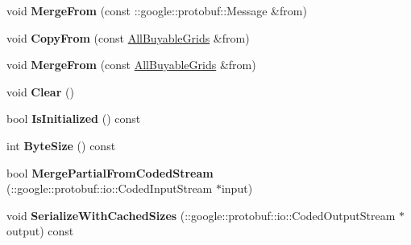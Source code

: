 \begin{DoxyCompactItemize}
\item 
\hypertarget{classmonopoly_1_1_all_buyable_grids_a18d90d89565400a55ee64d9d872d693e}{}void {\bfseries Merge\+From} (const \+::google\+::protobuf\+::\+Message \&from)\label{classmonopoly_1_1_all_buyable_grids_a18d90d89565400a55ee64d9d872d693e}

\item 
\hypertarget{classmonopoly_1_1_all_buyable_grids_a9f0e672d3a089e5165b0ec23db106200}{}void {\bfseries Copy\+From} (const \hyperlink{classmonopoly_1_1_all_buyable_grids}{All\+Buyable\+Grids} \&from)\label{classmonopoly_1_1_all_buyable_grids_a9f0e672d3a089e5165b0ec23db106200}

\item 
\hypertarget{classmonopoly_1_1_all_buyable_grids_a56f73a697b8834f68760d16df7d2552e}{}void {\bfseries Merge\+From} (const \hyperlink{classmonopoly_1_1_all_buyable_grids}{All\+Buyable\+Grids} \&from)\label{classmonopoly_1_1_all_buyable_grids_a56f73a697b8834f68760d16df7d2552e}

\item 
\hypertarget{classmonopoly_1_1_all_buyable_grids_acd7491cf2d04473ea03e21fc4ddc2e70}{}void {\bfseries Clear} ()\label{classmonopoly_1_1_all_buyable_grids_acd7491cf2d04473ea03e21fc4ddc2e70}

\item 
\hypertarget{classmonopoly_1_1_all_buyable_grids_a4ead6081cc726152784d14b63c37781b}{}bool {\bfseries Is\+Initialized} () const \label{classmonopoly_1_1_all_buyable_grids_a4ead6081cc726152784d14b63c37781b}

\item 
\hypertarget{classmonopoly_1_1_all_buyable_grids_a4cff9ff1770ce5f90173770a70eb9b06}{}int {\bfseries Byte\+Size} () const \label{classmonopoly_1_1_all_buyable_grids_a4cff9ff1770ce5f90173770a70eb9b06}

\item 
\hypertarget{classmonopoly_1_1_all_buyable_grids_af26b914074e22f09fa999cc3d6d90407}{}bool {\bfseries Merge\+Partial\+From\+Coded\+Stream} (\+::google\+::protobuf\+::io\+::\+Coded\+Input\+Stream $\ast$input)\label{classmonopoly_1_1_all_buyable_grids_af26b914074e22f09fa999cc3d6d90407}

\item 
\hypertarget{classmonopoly_1_1_all_buyable_grids_a00a34af40b1d43f3d13582d32113410f}{}void {\bfseries Serialize\+With\+Cached\+Sizes} (\+::google\+::protobuf\+::io\+::\+Coded\+Output\+Stream $\ast$output) const \label{classmonopoly_1_1_all_buyable_grids_a00a34af40b1d43f3d13582d32113410f}


\end{DoxyCompactItemize}
